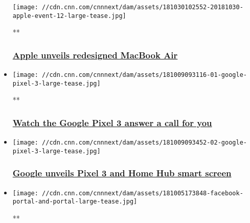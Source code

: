 \begin{itemize}
  \texttt{[image: //cdn.cnn.com/cnnnext/dam/assets/181030102552-20181030-apple-event-12-large-tease.jpg]}

  **

  \hypertarget{apple-unveils-redesigned-macbook-air}{%
  \subsubsection{\texorpdfstring{\href{/videos/business/2018/10/30/apple-event-new-products-brooklyn.cnn-business}{Apple
  unveils redesigned MacBook
  Air}}{Apple unveils redesigned MacBook Air}}\label{apple-unveils-redesigned-macbook-air}}
\item
  \href{/videos/business/2018/10/09/rick-osterloh-google-pixel-3-orig.cnn-business}{}

  \texttt{[image: //cdn.cnn.com/cnnnext/dam/assets/181009093116-01-google-pixel-3-large-tease.jpg]}

  **

  \hypertarget{watch-the-google-pixel-3-answer-a-call-for-you}{%
  \subsubsection{\texorpdfstring{\href{/videos/business/2018/10/09/rick-osterloh-google-pixel-3-orig.cnn-business}{Watch
  the Google Pixel 3 answer a call for
  you}}{Watch the Google Pixel 3 answer a call for you}}\label{watch-the-google-pixel-3-answer-a-call-for-you}}
\item
  \href{/2018/10/09/tech/google-pixel-3-home-hub/index.html}{}

  \texttt{[image: //cdn.cnn.com/cnnnext/dam/assets/181009093452-02-google-pixel-3-large-tease.jpg]}

  \hypertarget{google-unveils-pixel-3-and-home-hub-smart-screen}{%
  \subsubsection{\texorpdfstring{\href{/2018/10/09/tech/google-pixel-3-home-hub/index.html}{Google
  unveils Pixel 3 and Home Hub smart
  screen}}{Google unveils Pixel 3 and Home Hub smart screen}}\label{google-unveils-pixel-3-and-home-hub-smart-screen}}
\item
  \href{/videos/business/2018/10/05/facebook-portal-orig.cnn-business}{}

  \texttt{[image: //cdn.cnn.com/cnnnext/dam/assets/181005173848-facebook-portal-and-portal-large-tease.jpg]}

  **


\end{itemize}
